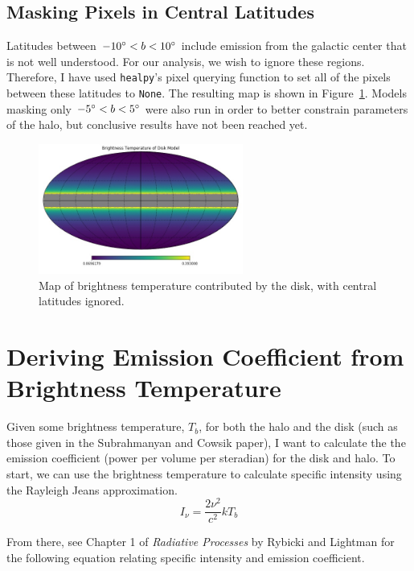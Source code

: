 \documentclass[letterpaper, 10pt]{article}
\begin{document}
 
\subsection{Masking Pixels in Central Latitudes}

Latitudes between $ -10\degree < b < 10\degree$ include emission from the galactic center that is not well understood. For our analysis, we wish to ignore these regions. Therefore, I have used \texttt{healpy}'s pixel querying function to set all of the pixels between these latitudes to \texttt{None}. The resulting map is shown in Figure~\ref{disk_mod}. Models masking only $ -5\degree < b < 5\degree$ were also run in order to better constrain parameters of the halo, but conclusive results have not been reached yet. 

\begin{figure}[h]
\begin{center}
\includegraphics[width=0.6\textwidth]{disk_mod.jpg}
\caption{Map of brightness temperature contributed by the disk, with central latitudes ignored.}
\label{disk_mod}
\end{center}
\end{figure}


\section{Deriving Emission Coefficient from Brightness Temperature}
Given some brightness temperature, $T_{b}$, for both the halo and the disk (such as those given in the Subrahmanyan and Cowsik paper), I want to calculate the the emission coefficient (power per volume per steradian) for the disk and halo. To start, we can use the brightness temperature to calculate specific intensity using the Rayleigh Jeans approximation. 
\[ I_{\nu} = \frac{2\nu^{2}}{c^{2}}kT_{b} \]

From there, see Chapter 1 of \emph{Radiative Processes} by Rybicki and Lightman for the following equation relating specific intensity and emission coefficient. 
\end{document}
